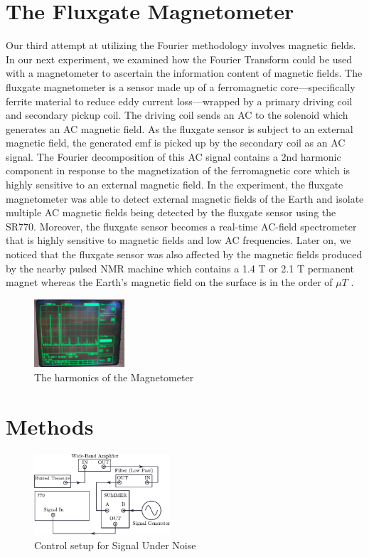\documentclass[prl,twocolumn,superscriptaddress,floatfix]{revtex4}
\begin{document}
\section{The Fluxgate Magnetometer}

Our third attempt at utilizing the Fourier methodology involves magnetic fields. 
In our next experiment, we examined how the Fourier Transform could be used with a magnetometer to ascertain the information content of magnetic fields.
The fluxgate magnetometer is a sensor made up of a ferromagnetic core---specifically ferrite material to reduce eddy current loss---wrapped by a primary driving coil and secondary pickup coil. The driving coil sends an AC to the solenoid which generates an AC magnetic field. As the fluxgate sensor is subject to an external magnetic field, the generated emf is picked up by the secondary coil as an AC signal. The Fourier decomposition of this AC signal contains a 2nd harmonic component in response to the magnetization of the ferromagnetic core which is highly sensitive to an external magnetic field.
In the experiment, the fluxgate magnetometer was able to detect external magnetic fields of the Earth and isolate multiple AC magnetic fields being detected by the fluxgate sensor using the SR770. Moreover, the fluxgate sensor becomes a real-time AC-field spectrometer that is highly sensitive to magnetic fields and low AC frequencies.
Later on, we noticed that the fluxgate sensor was also affected by the magnetic fields produced by the nearby pulsed NMR machine which contains a 1.4 T or 2.1 T permanent magnet whereas the Earth's magnetic field on the surface is in the order of $\mu T$ \cite{Cornell2000}.

\begin{figure}[H]
    \centering
    \includegraphics[width=0.3\textwidth]{Magnetometer Data.jpg}
    \caption{The harmonics of the Magnetometer}
    \label{fig:enter-label}
\end{figure}

\section{Methods}

\begin{figure}[H]
    \includegraphics[width=0.45\textwidth]{exp1_1.pdf}
    \caption{Control setup for Signal Under Noise}
    \label{fig:exp1}
\end{figure}
\end{document}
